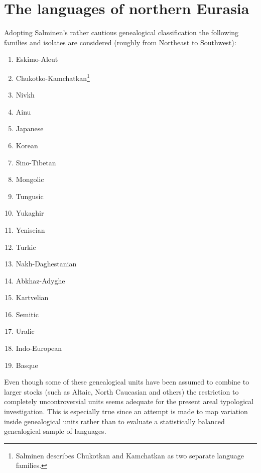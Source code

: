\section{The languages of northern Eurasia}
Adopting Salminen's rather cautious genealogical classification the following families and isolates are considered (roughly from Northeast to Southwest):
\begin{multicols}{2}
\begin{enumerate}
\item{Eskimo-Aleut}
\item{Chukotko-Kamchatkan}\footnote{Salminen describes Chukotkan and Kamchatkan as two separate language families.}
\item{Nivkh}
\item{Ainu}
\item{Japanese}
\item{Korean}
\item{Sino-Tibetan}
\item{Mongolic}
\item{Tungusic}
\item{Yukaghir}
\item{Yeniseian}
\item{Turkic}
\item{Nakh-Daghestanian}
\item{Abkhaz-Adyghe}
\item{Kartvelian}
\item{Semitic}
\item{Uralic}
\item{Indo-European}
\item{Basque}
\end{enumerate}
\end{multicols}
Even though some of these genealogical units have been assumed to combine to larger stocks (such as Altaic, North Caucasian and others) the restriction to completely uncontroversial units seems adequate for the present areal typological investigation. This is especially true since an attempt is made to map variation inside genealogical units rather than to evaluate a statistically balanced genealogical sample of languages.

